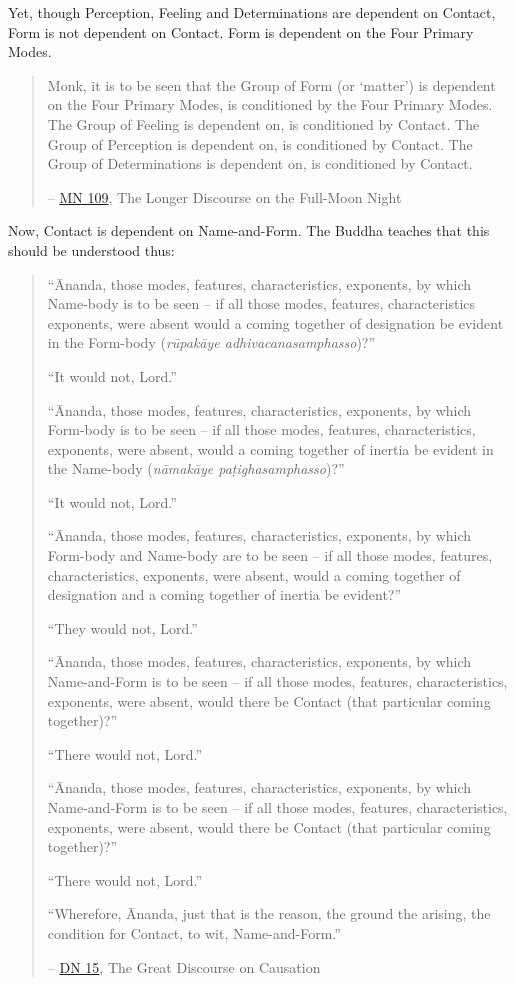 Yet, though Perception, Feeling and Determinations are dependent on Contact, Form is not dependent on Contact. Form is dependent on the Four Primary Modes.

\begin{quote}
\protect\hypertarget{dependent}{}{}Monk, it is to be seen that the Group of Form (or `matter') is dependent on the Four Primary Modes, is conditioned by the Four Primary Modes. The Group of Feeling is dependent on, is conditioned by Contact. The Group of Perception is dependent on, is conditioned by Contact. The Group of Determinations is dependent on, is conditioned by Contact.

 -- \href{https://suttacentral.net/mn109/en/sujato}{MN 109}, The Longer Discourse on the Full-Moon Night
\end{quote}

Now, Contact is dependent on Name-and-Form. The Buddha teaches that this should be understood thus:

\begin{quote}
``Ānanda, those modes, features, characteristics, exponents, by which Name-body is to be seen -- if all those modes, features, characteristics exponents, were absent would a coming together of designation be evident in the Form-body (\textit{rūpakāye adhivacanasamphasso})?''

``It would not, Lord.''

``Ānanda, those modes, features, characteristics, exponents, by which Form-body is to be seen -- if all those modes, features, characteristics, exponents, were absent, would a coming together of inertia be evident in the Name-body (\textit{nāmakāye paṭighasamphasso})?''

``It would not, Lord.''

``Ānanda, those modes, features, characteristics, exponents, by which Form-body and Name-body are to be seen -- if all those modes, features, characteristics, exponents, were absent, would a coming together of designation and a coming together of inertia be evident?''

``They would not, Lord.''

``Ānanda, those modes, features, characteristics, exponents, by which Name-and-Form is to be seen -- if all those modes, features, characteristics, exponents, were absent, would there be Contact (that particular coming together)?''

``There would not, Lord.''

``Ānanda, those modes, features, characteristics, exponents, by which Name-and-Form is to be seen -- if all those modes, features, characteristics, exponents, were absent, would there be Contact (that particular coming together)?''

``There would not, Lord.''

``Wherefore, Ānanda, just that is the reason, the ground the arising, the condition for Contact, to wit, Name-and-Form.''

 -- \href{https://suttacentral.net/dn15/en/bodhi}{DN 15}, The Great Discourse on Causation
\end{quote}

